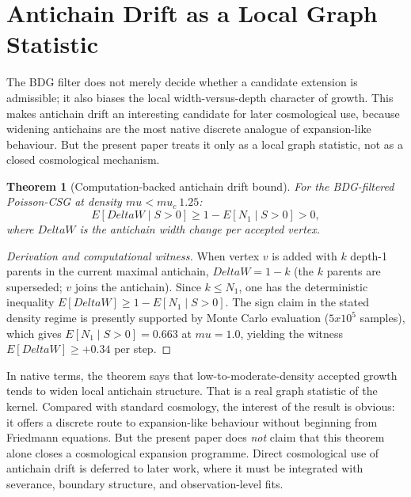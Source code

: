 \documentclass[11pt]{article}
\def\Delta{Delta}%
\def\mu{mu}%
\def\mathbb#1{#1}%
\def\times{x}%
\def\approx{~}%
\newtheorem{theorem}{Theorem}
\begin{document}
\section{Antichain Drift as a Local Graph Statistic}
\label{sec:drift}

The BDG filter does not merely decide whether a candidate extension is admissible; it also biases the local width-versus-depth character of growth. This makes antichain drift an interesting candidate for later cosmological use, because widening antichains are the most native discrete analogue of expansion-like behaviour. But the present paper treats it only as a local graph statistic, not as a closed cosmological mechanism.

\begin{theorem}[Computation-backed antichain drift bound]
\label{thm:drift}
For the BDG-filtered Poisson-CSG at density $\mu<\mu_c\approx 1.25$:
\begin{equation}
\mathbb{E}[\Delta W\mid S>0] \ge 1-\mathbb{E}[N_1\mid S>0] > 0,
\end{equation}
where $\Delta W$ is the antichain width change per accepted vertex.
\end{theorem}
\begin{proof}[Derivation and computational witness]
When vertex $v$ is added with $k$ depth-1 parents in the current maximal antichain, $\Delta W=1-k$ (the $k$ parents are superseded; $v$ joins the antichain). Since $k\le N_1$, one has the deterministic inequality $\mathbb{E}[\Delta W]\ge 1-\mathbb{E}[N_1\mid S>0]$. The sign claim in the stated density regime is presently supported by Monte Carlo evaluation ($5\times 10^5$ samples), which gives $\mathbb{E}[N_1\mid S>0]=0.663$ at $\mu=1.0$, yielding the witness $\mathbb{E}[\Delta W]\ge +0.34$ per step.
\end{proof}

In native terms, the theorem says that low-to-moderate-density accepted growth tends to widen local antichain structure. That is a real graph statistic of the kernel. Compared with standard cosmology, the interest of the result is obvious: it offers a discrete route to expansion-like behaviour without beginning from Friedmann equations. But the present paper does \emph{not} claim that this theorem alone closes a cosmological expansion programme. Direct cosmological use of antichain drift is deferred to later work, where it must be integrated with severance, boundary structure, and observation-level fits.
\end{document}
